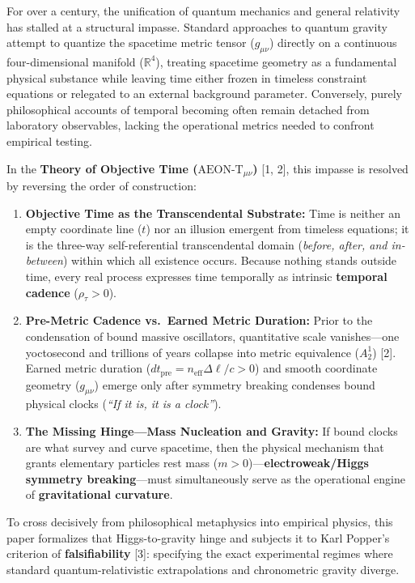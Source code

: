 \documentclass[
]{article}
\providecommand{\tightlist}{%
  \setlength{\itemsep}{0pt}\setlength{\parskip}{0pt}}
\begin{document}
For over a century, the unification of quantum mechanics and general
relativity has stalled at a structural impasse. Standard approaches to
quantum gravity attempt to quantize the spacetime metric tensor
(\(g_{\mu\nu}\)) directly on a continuous four-dimensional manifold
(\(\mathbb{R}^4\)), treating spacetime geometry as a fundamental
physical substance while leaving time either frozen in timeless
constraint equations or relegated to an external background parameter.
Conversely, purely philosophical accounts of temporal becoming often
remain detached from laboratory observables, lacking the operational
metrics needed to confront empirical testing.

In the \textbf{Theory of Objective Time (\(\text{AEON-T}_{\mu\nu}\))}
{[}1, 2{]}, this impasse is resolved by reversing the order of
construction:

\begin{enumerate}
\def\labelenumi{\arabic{enumi}.}
\tightlist
\item
  \textbf{Objective Time as the Transcendental Substrate:} Time is
  neither an empty coordinate line (\(t\)) nor an illusion emergent from
  timeless equations; it is the three-way self-referential
  transcendental domain (\emph{before, after, and in-between}) within
  which all existence occurs. Because nothing stands outside time, every
  real process expresses time temporally as intrinsic \textbf{temporal
  cadence} (\(\rho_\tau > 0\)).
\item
  \textbf{Pre-Metric Cadence vs.~Earned Metric Duration:} Prior to the
  condensation of bound massive oscillators, quantitative scale
  vanishes---one yoctosecond and trillions of years collapse into metric
  equivalence (\(A_2^1\)) {[}2{]}. Earned metric duration
  (\(dt_{\mathrm{pre}} = n_{\mathrm{eff}}\Delta\ell / c > 0\)) and
  smooth coordinate geometry (\(g_{\mu\nu}\)) emerge only after symmetry
  breaking condenses bound physical clocks (\emph{``If it is, it is a
  clock''}).
\item
  \textbf{The Missing Hinge---Mass Nucleation and Gravity:} If bound
  clocks are what survey and curve spacetime, then the physical
  mechanism that grants elementary particles rest mass
  (\(m > 0\))---\textbf{electroweak/Higgs symmetry breaking}---must
  simultaneously serve as the operational engine of
  \textbf{gravitational curvature}.
\end{enumerate}

To cross decisively from philosophical metaphysics into empirical
physics, this paper formalizes that Higgs-to-gravity hinge and subjects
it to Karl Popper's criterion of \textbf{falsifiability} {[}3{]}:
specifying the exact experimental regimes where standard
quantum-relativistic extrapolations and chronometric gravity diverge.
\end{document}
